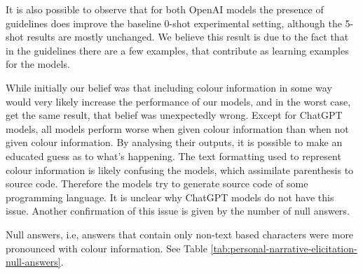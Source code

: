 It is also possible to observe that for both OpenAI models the presence of guidelines does improve the baseline 0-shot experimental setting, although the 5-shot results are mostly unchanged. We believe this result is due to the fact that in the guidelines there are a few examples, that contribute as learning examples for the models.  

While initially our belief was that including colour information in some way would very likely increase the performance of our models, and in the worst case, get the same result, that belief was unexpectedly wrong. Except for ChatGPT models, all models perform worse when given colour information than when not given colour information. By analysing their outputs, it is possible to make an educated guess as to what's happening. The text formatting used to represent colour information is likely confusing the models, which assimilate parenthesis to source code. Therefore the models try to generate source code of some programming language. It is unclear why ChatGPT models do not have this issue. Another confirmation of this issue is given by the number of null answers. 

Null answers, i.e, answers that contain only non-text based characters were more pronounced with colour information. See Table \ref{tab:personal-narrative-elicitation-null-answers}.


